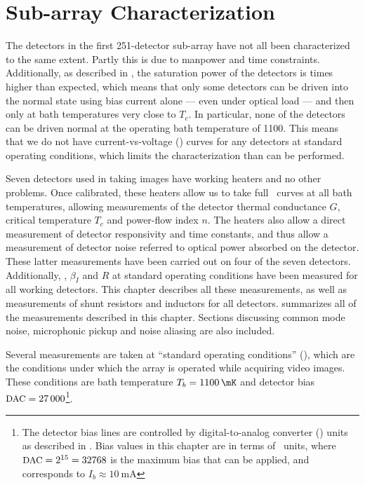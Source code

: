 \chapter{Sub-array Characterization}\label{c:det-array}

The detectors in the first 251-detector sub-array have not all been characterized to the same extent.
Partly this is due to manpower and time constraints.
Additionally, as described in , the saturation power of the detectors is  times higher than expected, which means that only some detectors can be driven into the normal state using bias current alone --- even under optical load --- and then only at bath temperatures very close to $T_c$.
In particular, none of the detectors can be driven normal at the operating bath temperature of \SI{1100}{\mK}.
This means that we do not have current-vs-voltage (\IV) curves for any detectors at standard operating conditions, which limits the characterization than can be performed.

Seven detectors used in taking images have working heaters and no other problems.
Once calibrated, these heaters allow us to take full \IV\ curves at all bath temperatures, allowing measurements of the detector thermal conductance $G$, critical temperature $T_c$ and power-flow index $n$.
The heaters also allow a direct measurement of detector responsivity and time constants, and thus allow a measurement of detector noise referred to optical power absorbed on the detector.
These latter measurements have been carried out on four of the seven detectors.
Additionally, \Loop, $\beta_I$ and $R$ at standard operating conditions have been measured for all working detectors.
This chapter describes all these measurements, as well as measurements of shunt resistors and inductors for all detectors.
 summarizes all of the measurements described in this chapter.
Sections discussing common mode noise, microphonic pickup and noise aliasing are also included.

Several measurements are taken at ``standard operating conditions'' (\SOC), which are the conditions under which the array is operated while acquiring video images.
These conditions are bath temperature $T_b = \SI{1100}{\mK}$ and detector bias $\mbox{{\small DAC}} = \num{27000}$\footnote{The detector bias lines are controlled by digital-to-analog converter (\DAC) units as described in . Bias values in this chapter are in terms of \DAC\ units, where $\mbox{{\small DAC}} = 2^{15} = 32768$ is the maximum bias that can be applied, and corresponds to $I_b \approx \SI{10}{\mA}$}.

